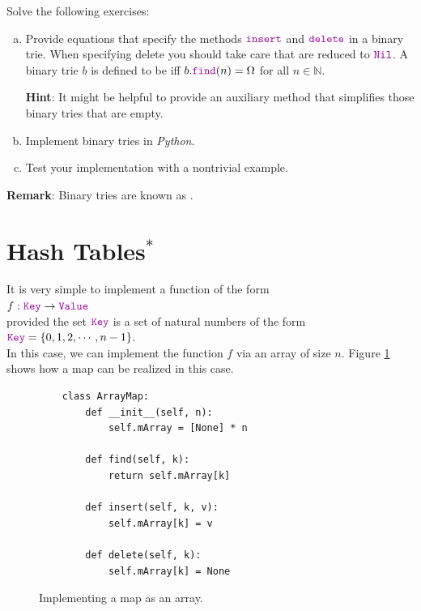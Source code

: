 Solve the following exercises:
\begin{enumerate}[(a)]
\item Provide equations that specify the methods $\mytt{insert}$ and $\mytt{delete}$ in a binary trie.
      When specifying delete you should take care that  are reduced to
      $\mytt{Nil}$.  A binary trie $b$ is defined to be  iff $b.\mytt{find}(n) = \Omega$ for all $n \in \mathbb{N}$.

      \textbf{Hint}:  It might be helpful to provide an auxiliary method that simplifies those binary tries
      that are empty. 
\item Implement binary tries in \textsl{Python}.
\item Test your implementation with a nontrivial example.
\end{enumerate}
\textbf{Remark}: Binary tries are known as .  \eox

\section{Hash Tables$^*$}
It is very simple to implement a function of the form \\[0.2cm]
\hspace*{1.3cm} $f: \mytt{Key} \rightarrow \mytt{Value}$ \\[0.2cm]
provided the set $\mytt{Key}$ is a set of natural numbers of the form  \\[0.2cm]
\hspace*{1.3cm} $\mytt{Key} = \{ 0, 1, 2, \cdots, n-1 \}$. \\[0.2cm]
In this case, we can implement the function $f$ via an array of size $n$.
Figure \ref{fig:map-array.ipython} shows how a map can be realized in this case.

\begin{figure}[!ht]
\centering
\begin{verbatim}
    class ArrayMap:
        def __init__(self, n):
            self.mArray = [None] * n
            
        def find(self, k):
            return self.mArray[k]
        
        def insert(self, k, v):
            self.mArray[k] = v
    
        def delete(self, k):
            self.mArray[k] = None
\end{verbatim}
\vspace*{-0.3cm}
\caption{Implementing a map as an array.}
\label{fig:map-array.ipython}
\end{figure}

